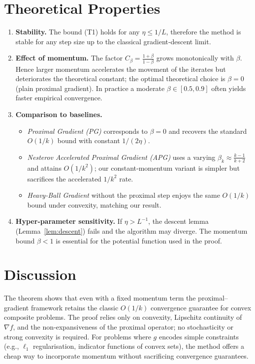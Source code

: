 \documentclass{article}
\newcommand{\grad}{\nabla}
\begin{document}
\section*{Theoretical Properties}
\begin{enumerate}[label=\arabic*.]
\item \textbf{Stability.} The bound (T1) holds for any $\eta\le 1/L$, therefore the method is stable for any step size up to the classical gradient‑descent limit.
\item \textbf{Effect of momentum.} The factor $C_{\beta}=\frac{1+\beta}{1-\beta}$ grows monotonically with $\beta$.  Hence larger momentum accelerates the movement of the iterates but deteriorates the theoretical constant; the optimal theoretical choice is $\beta=0$ (plain proximal gradient).  In practice a moderate $\beta\in[0.5,0.9]$ often yields faster empirical convergence.
\item \textbf{Comparison to baselines.}
    \begin{itemize}
        \item \emph{Proximal Gradient (PG)} corresponds to $\beta=0$ and recovers the standard $O(1/k)$ bound with constant $1/(2\eta)$.
        \item \emph{Nesterov Accelerated Proximal Gradient (APG)} uses a varying $\beta_{k}\approx\frac{k-1}{k+2}$ and attains $O(1/k^{2})$; our constant‑momentum variant is simpler but sacrifices the accelerated $1/k^{2}$ rate.
        \item \emph{Heavy‑Ball Gradient} without the proximal step enjoys the same $O(1/k)$ bound under convexity, matching our result.
    \end{itemize}
\item \textbf{Hyper‑parameter sensitivity.} If $\eta>L^{-1}$, the descent lemma (Lemma~\ref{lem:descent}) fails and the algorithm may diverge.  The momentum bound $\beta<1$ is essential for the potential function used in the proof.
\end{enumerate}

\section*{Discussion}
The theorem shows that even with a fixed momentum term the proximal–gradient framework retains the classic $O(1/k)$ convergence guarantee for convex composite problems.  The proof relies only on convexity, Lipschitz continuity of $\grad f$, and the non‑expansiveness of the proximal operator; no stochasticity or strong convexity is required.  For problems where $g$ encodes simple constraints (e.g., $\ell_{1}$ regularisation, indicator functions of convex sets), the method offers a cheap way to incorporate momentum without sacrificing convergence guarantees.
\end{document}
